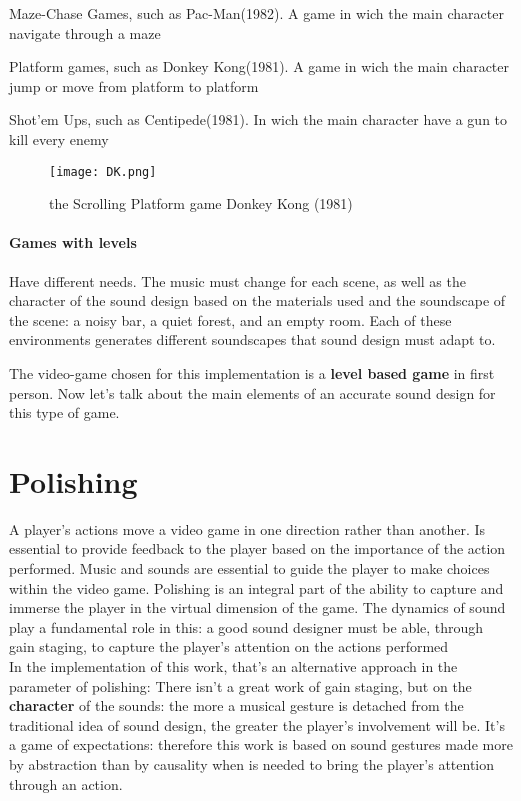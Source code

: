 		\begin{compactitem}
			\item Maze-Chase Games, such as Pac-Man(1982). A game in wich the main character navigate through a maze
			\item Platform games, such as Donkey Kong(1981). A game in wich the main character jump or move from platform to platform
			\item Shot'em Ups, such as Centipede(1981). In wich the main character have a gun to kill every enemy
		\end{compactitem}

	\begin{figure}[h]
		\begin{center}
			\texttt{[image: DK.png]}
			\caption{the Scrolling Platform game Donkey Kong (1981)}
		\end{center}
	\end{figure}

	\paragraph{Games with levels} Have different needs. The music must change for each scene, as well as the character of the sound design based on the materials used and the soundscape of the scene: a noisy bar, a quiet forest, and an empty room. Each of these environments generates different soundscapes that sound design must adapt to.

The video-game chosen for this implementation is a \textbf{level based game} in first person. Now let's talk about the main elements of an accurate sound design for this type of game.

\section{Polishing}

A player's actions move a video game in one direction rather than another. Is essential to provide feedback to the player based on the importance of the action performed. Music and sounds are essential to guide the player to make choices within the video game. Polishing is an integral part of the ability to capture and immerse the player in the virtual dimension of the game. The dynamics of sound play a fundamental role in this: a good sound designer must be able, through gain staging, to capture the player's attention on the actions performed \\
In the implementation of this work, that's an alternative approach in the parameter of polishing: There isn't a great work of gain staging, but on the \textbf{character} of the sounds: the more a musical gesture is detached from the traditional idea of ​​sound design, the greater the player's involvement will be. It's a game of expectations: therefore this work is based on sound gestures made more by abstraction than by causality when is needed to bring the player's attention through an action.

